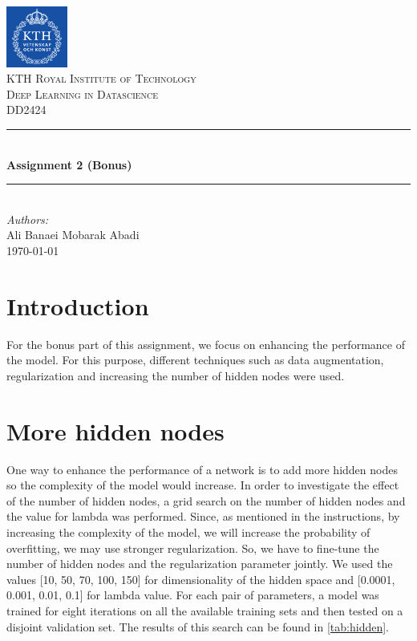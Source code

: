 \documentclass[a4paper]{article}
\begin{document}
\begin{titlepage}

\newcommand{\HRule}{\rule{\linewidth}{0.5mm}} 							%
\center 
 
 

\includegraphics[width=0.15\textwidth]{images/kth_logo.png}\\[0.5cm] 	%

\textsc{\LARGE KTH Royal Institute of Technology}\\[1cm]

\textsc{\Large Deep Learning in Datascience}\\[0.2cm]
\textsc{\large DD2424}\\[1cm] 										%
\HRule \\[0.8cm]
{ \huge \bfseries Assignment 2 (Bonus)}\\[0.7cm]								%
\HRule \\[2cm]
\large
\emph{Authors:}\\
Ali Banaei Mobarak Abadi\\[1.5cm]													%
{\large \today}\\[5cm]

\vfill 
\end{titlepage}

\section{Introduction}

For the bonus part of this assignment, we focus on enhancing the performance of the model. For this purpose, different techniques such as data augmentation, regularization and increasing the number of hidden nodes were used.

\section{More hidden nodes}

One way to enhance the performance of a network is to add more hidden nodes so the complexity of the model would increase. In order to investigate the effect of the number of hidden nodes, a grid search on the number of hidden nodes and the value for lambda was performed. Since, as mentioned in the instructions, by increasing the complexity of the model, we will increase the probability of overfitting, we may use stronger regularization. So, we have to fine-tune the number of hidden nodes and the regularization parameter jointly. We used the values [10, 50, 70, 100, 150] for dimensionality of the hidden space and [0.0001, 0.001, 0.01, 0.1] for lambda value. For each pair of parameters, a model was trained for eight iterations on all the available training sets and then tested on a disjoint validation set. The results of this search can be found in \autoref{tab:hidden}.
\end{document}
